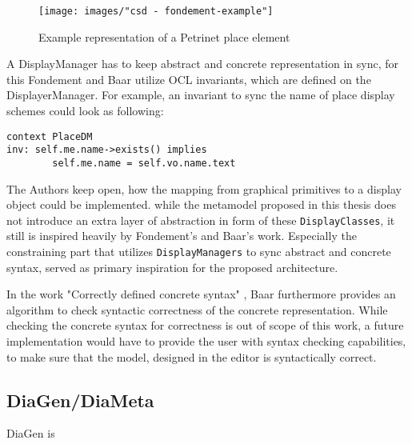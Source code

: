 \begin{figure}[H]
  \centering
  \texttt{[image: images/"csd - fondement-example"]}
  \caption{Example representation of a Petrinet place element}
  \label{fig:fondement_dm}
\end{figure}

A DisplayManager has to keep abstract and concrete representation in sync, for this Fondement and Baar utilize OCL invariants, which are defined on the DisplayerManager. For example, an invariant to sync the name of place display schemes could look as following:

\begin{lstlisting}[language=OCL,captionpos=b,caption={OCL Invariant that syncs the name attribute of \texttt{DisplayClass} and model element.}]
context PlaceDM
inv: self.me.name->exists() implies
        self.me.name = self.vo.name.text
\end{lstlisting}

The Authors keep open, how the mapping from graphical primitives to a display object could be implemented. while the metamodel proposed in this thesis does not introduce an extra layer of abstraction in form of these \texttt{DisplayClasses}, it still is inspired heavily by Fondement's and Baar's work. Especially the constraining part that utilizes \texttt{DisplayManagers} to sync abstract and concrete syntax, served as primary inspiration for the proposed architecture.

In the work "Correctly defined concrete syntax" \cite{baar_correctly_2008}, Baar furthermore provides an algorithm to check syntactic correctness of the concrete representation. While checking the concrete syntax for correctness is out of scope of this work, a future implementation would have to provide the user with syntax checking capabilities, to make sure that the model, designed in the editor is syntactically correct.


\subsection{DiaGen/DiaMeta}
DiaGen is 
